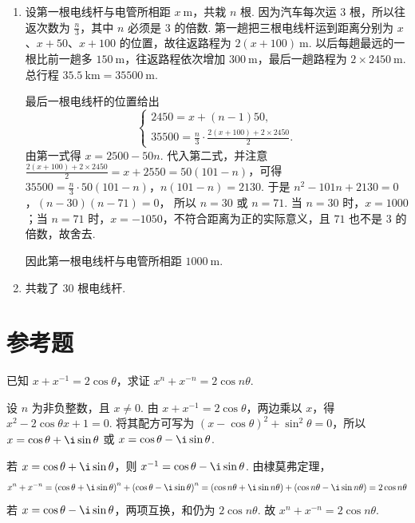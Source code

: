 \begin{solution}
\begin{enumerate}
\item 设第一根电线杆与电管所相距 \(x\mathrm{~m}\)，共栽 \(n\) 根. 因为汽车每次运 \(3\) 根，所以往返次数为 \(\frac n3\)，其中 \(n\) 必须是 \(3\) 的倍数. 第一趟把三根电线杆运到距离分别为 \(x\)、\(x+50\)、\(x+100\) 的位置，故往返路程为 \(2(x+100)\mathrm{~m}\). 以后每趟最远的一根比前一趟多 \(150\mathrm{~m}\)，往返路程依次增加 \(300\mathrm{~m}\)，最后一趟路程为 \(2\times2450\mathrm{~m}\). 总行程 \(35.5\mathrm{~km}=35500\mathrm{~m}\).

最后一根电线杆的位置给出
\[
\begin{cases}
2450=x+\left( n-1 \right)50,\\
35500=\frac n3\cdot\frac{2(x+100)+2\times2450}{2}.
\end{cases}
\]
由第一式得 \(x=2500-50n\). 代入第二式，并注意
\(\frac{2(x+100)+2\times2450}{2}=x+2550=50(101-n)\)，可得
\(35500=\frac n3\cdot50(101-n)\)，\(n(101-n)=2130\).
于是
\(n^2-101n+2130=0\)，\((n-30)(n-71)=0\)，
所以 \(n=30\) 或 \(n=71\). 当 \(n=30\) 时，\(x=1000\)；当 \(n=71\) 时，\(x=-1050\)，不符合距离为正的实际意义，且 \(71\) 也不是 \(3\) 的倍数，故舍去.

因此第一根电线杆与电管所相距 \(1000\mathrm{~m}\).

\item 共栽了 \(30\) 根电线杆.
\end{enumerate}
\end{solution}

\section{参考题}

\begin{problem}
已知 \( x+x^{-1}=2\cos\theta \)，求证 \( x^n+x^{-n}=2\cos n\theta \).
\end{problem}

\begin{solution}
设 \(n\) 为非负整数，且 \(x\ne0\). 由 \(x+x^{-1}=2\cos\theta\)，两边乘以 \(x\)，得
\(x^2-2\cos\theta x+1=0\). 将其配方可写为
\(\left(x-\cos\theta\right)^2+\sin^2\theta=0\)，所以
\(x=\cos\theta+\i\sin\theta\) 或 \(x=\cos\theta-\i\sin\theta\).

若 \(x=\cos\theta+\i\sin\theta\)，则 \(x^{-1}=\cos\theta-\i\sin\theta\). 由棣莫弗定理，
\[
x^n+x^{-n}
=\left(\cos\theta+\i\sin\theta\right)^n
  +\left(\cos\theta-\i\sin\theta\right)^n
=\left(\cos n\theta+\i\sin n\theta\right)
  +\left(\cos n\theta-\i\sin n\theta\right)
=2\cos n\theta
\]
若 \(x=\cos\theta-\i\sin\theta\)，两项互换，和仍为 \(2\cos n\theta\). 故
\(x^n+x^{-n}=2\cos n\theta\).
\end{solution}


